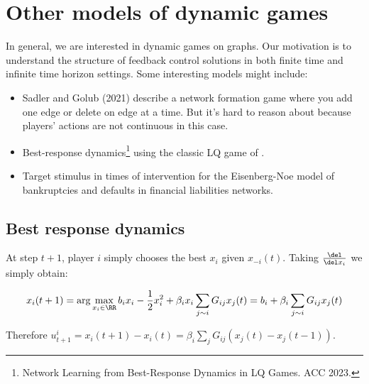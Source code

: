 
\section{Other models of dynamic games}

In general, we are interested in dynamic games on graphs.  Our motivation is to understand the structure of feedback control solutions in both finite time and infinite time horizon settings. Some interesting models might include: 

\begin{itemize}
    \item Sadler and Golub (2021) describe a network formation game where you add one edge or delete on edge at a time. But it's hard to reason about because players' actions are not continuous in this case. 
    \item Best-response dynamics\footnote{Network Learning from Best-Response Dynamics in LQ Games. ACC 2023.} using the classic LQ game of \cite{leng2020learning}. 
    \item Target stimulus in times of intervention for the Eisenberg-Noe model of bankruptcies and defaults in financial liabilities networks. 
\end{itemize}

\subsection{Best response dynamics}

At step $t + 1$, player $i$ simply chooses the best $x_i$ given $x_{-i}(t)$. Taking $\frac{\del}{\del x_i}$ we simply obtain: 

\[
x_i(t + 1) = \arg \max_{x_i \in \RR} b_i x_i - \frac 1 2 x_i^2 + \beta_i x_i \sum_{j \sim i} G_{ij} x_j(t)
= b_i + \beta_i \sum_{j \sim i} G_{ij} x_j(t)
\]

Therefore $u_{t+1}^{i} = x_i(t+1) - x_i(t) = \beta_i \sum\limits_{j} G_{ij}(x_j(t) - x_j(t-1))$. 

